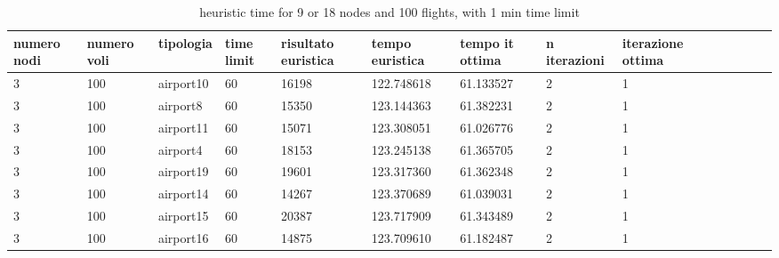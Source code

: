 \documentclass[../thesis.tex]{subfiles}
\begin{document}
\begin{table}[!ht]
\caption{heuristic time for 9 or 18 nodes and 100 flights, with 1 min time limit}
    \centering
    \begin{tabularx}{\textwidth}{|X|X|X|X|X|X|X|X|X|X|X|X|X|X|}
    \hline
        numero nodi & numero voli & tipologia & time limit & risultato euristica & tempo euristica & tempo it ottima & n iterazioni &iterazione ottima  \\ \hline
        3 & 100 & airport10 & 60 & 16198 & 122.748618 & 61.133527 & 2 & 1 \\ \hline
        3 & 100 & airport8 & 60 & 15350 & 123.144363 & 61.382231 & 2 & 1 \\ \hline
        3 & 100 & airport11 & 60 & 15071 & 123.308051 & 61.026776 & 2 & 1 \\ \hline
        3 & 100 & airport4 & 60 & 18153 & 123.245138 & 61.365705 & 2 & 1 \\ \hline
        3 & 100 & airport19 & 60 & 19601 & 123.317360 & 61.362348 & 2 & 1 \\ \hline
        3 & 100 & airport14 & 60 & 14267 & 123.370689 & 61.039031 & 2 & 1 \\ \hline
        3 & 100 & airport15 & 60 & 20387 & 123.717909 & 61.343489 & 2 & 1 \\ \hline
        3 & 100 & airport16 & 60 & 14875 & 123.709610 & 61.182487 & 2 & 1 \\ \hline
    \end{tabularx}
\end{table}
\end{document}
